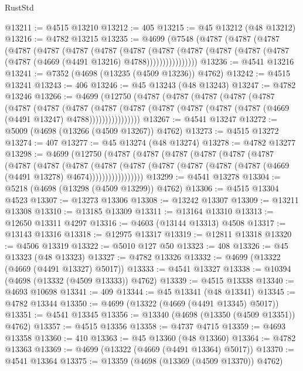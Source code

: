 \begin{lexlean}{RustStd}
\begin{coremodule}
@13211 := @4515 @13210
@13212 := 405
@13215 := @45 @13212 (@48 @13212)
@13216 := @4782 @13215
@13235 := @4699
    (@7548
      (@4787
        (@4787
          (@4787
            (@4787
              (@4787
                (@4787
                  (@4787
                    (@4787
                      (@4787
                        (@4787
                          (@4787 (@4787 (@4787 (@4787 (@4669 (@4491 @13216) @4788))))))))))))))))
@13236 := @4541 @13216
@13241 := @7352 (@4698 (@13235 (@4509 @13236)) @4762)
@13242 := @4515 @13241
@13243 := 406
@13246 := @45 @13243 (@48 @13243)
@13247 := @4782 @13246
@13266 := @4699
    (@12750
      (@4787
        (@4787
          (@4787
            (@4787
              (@4787
                (@4787
                  (@4787
                    (@4787
                      (@4787
                        (@4787
                          (@4787 (@4787 (@4787 (@4787 (@4669 (@4491 @13247) @4788))))))))))))))))
@13267 := @4541 @13247
@13272 := @5009 (@4698 (@13266 (@4509 @13267)) @4762)
@13273 := @4515 @13272
@13274 := 407
@13277 := @45 @13274 (@48 @13274)
@13278 := @4782 @13277
@13298 := @4699
    (@12750
      (@4787
        (@4787
          (@4787
            (@4787
              (@4787
                (@4787
                  (@4787
                    (@4787
                      (@4787
                        (@4787
                          (@4787
                            (@4787 (@4787 (@4787 (@4787 (@4669 (@4491 @13278) @4674)))))))))))))))))
@13299 := @4541 @13278
@13304 := @5218 (@4698 (@13298 (@4509 @13299)) @4762)
@13306 := @4515 @13304 @4523
@13307 := @13273 @13306
@13308 := @13242 @13307
@13309 := @13211 @13308
@13310 := @13185 @13309
@13311 := @13164 @13310
@13313 := @12650 @13311 @4297
@13316 := @4603 (@13144 @13313) @4508
@13317 := @13143 @13316
@13318 := @12975 @13317
@13319 := @12811 @13318
@13320 := @4506 @13319
@13322 := @5010 @127 @50
@13323 := 408
@13326 := @45 @13323 (@48 @13323)
@13327 := @4782 @13326
@13332 := @4699 (@13322 (@4669 (@4491 @13327) @5017))
@13333 := @4541 @13327
@13338 := @10394 (@4698 (@13332 (@4509 @13333)) @4762)
@13339 := @4515 @13338
@13340 := @4693 @10698
@13341 := 409
@13344 := @45 @13341 (@48 @13341)
@13345 := @4782 @13344
@13350 := @4699 (@13322 (@4669 (@4491 @13345) @5017))
@13351 := @4541 @13345
@13356 := @13340 (@4698 (@13350 (@4509 @13351)) @4762)
@13357 := @4515 @13356
@13358 := @4737 @4715
@13359 := @4693 @13358
@13360 := 410
@13363 := @45 @13360 (@48 @13360)
@13364 := @4782 @13363
@13369 := @4699 (@13322 (@4669 (@4491 @13364) @5017))
@13370 := @4541 @13364
@13375 := @13359 (@4698 (@13369 (@4509 @13370)) @4762)

\end{coremodule}
\end{lexlean}
